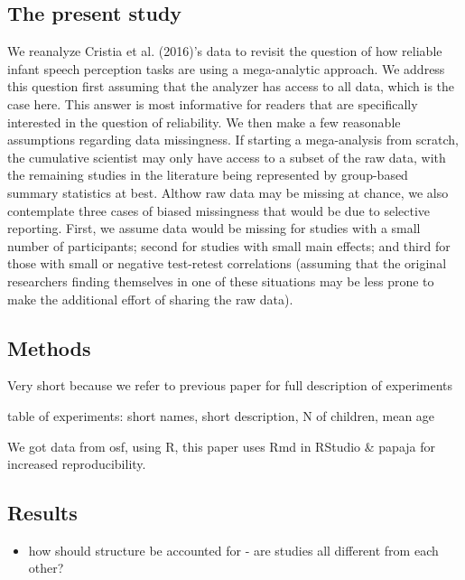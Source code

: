 \documentclass[man]{apa6}
\providecommand{\tightlist}{%
  \setlength{\itemsep}{0pt}\setlength{\parskip}{0pt}}
\begin{document}
\subsection{The present study}\label{the-present-study}

We reanalyze Cristia et al. (2016)'s data to revisit the question of how
reliable infant speech perception tasks are using a mega-analytic
approach. We address this question first assuming that the analyzer has
access to all data, which is the case here. This answer is most
informative for readers that are specifically interested in the question
of reliability. We then make a few reasonable assumptions regarding data
missingness. If starting a mega-analysis from scratch, the cumulative
scientist may only have access to a subset of the raw data, with the
remaining studies in the literature being represented by group-based
summary statistics at best. Althow raw data may be missing at chance, we
also contemplate three cases of biased missingness that would be due to
selective reporting. First, we assume data would be missing for studies
with a small number of participants; second for studies with small main
effects; and third for those with small or negative test-retest
correlations (assuming that the original researchers finding themselves
in one of these situations may be less prone to make the additional
effort of sharing the raw data).

\subsection{Methods}\label{methods}

Very short because we refer to previous paper for full description of
experiments

table of experiments: short names, short description, N of children,
mean age

We got data from osf, using R, this paper uses Rmd in RStudio \& papaja
for increased reproducibility.

\subsection{Results}\label{results}

\begin{itemize}
\tightlist
\item
  how should structure be accounted for - are studies all different from
  each other?
\end{itemize}
\end{document}
